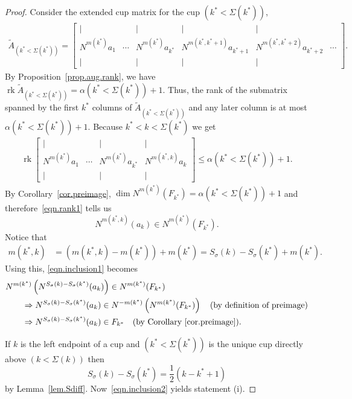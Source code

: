 \documentclass[11pt]{amsart}
\theoremstyle{remark}
\theoremstyle{remark}
\theoremstyle{definition}
\theoremstyle{definition}
\theoremstyle{definition}
\numberwithin{equation}{section}
\newcommand{\rk}{\operatorname{rk}}
\newcommand{\gs}{\sigma}
\newcommand{\al}{\alpha}
\newcommand{\E}{\Sigma}
\newcommand{\m}[2]{m(#1,#2)}
\newcommand{\mi}[1]{m(#1)}
\begin{document}
\begin{proof} Consider the extended cup matrix for the cup $(k^* < \E(k^*))$,
\begin{eqnarray*}
 \widetilde A_{(k^*<\E(k^*))}=\begin{bmatrix}
| &  & | & | & | &  \\   
N^{\mi{k^*}}a_1 &  \cdots& N^{\mi{k^*}}a_{k^*}&  N^{\m{k^*}{k^*+1}}a_{k^*+1} & N^{\m{k^*}{k^*+2}} a_{k^*+2} & \cdots 
\\ | &  & | & | & | &
\end{bmatrix}.
\end{eqnarray*}
By Proposition~\ref{prop.aug.rank}, we have $\rk \widetilde A_{(k^*<\E(k^*))} = \al(k^*<\E(k^*))+1$. Thus, the rank of the submatrix spanned by the first $k^*$ columns of $\widetilde A_{(k^*<\E(k^*))}$ and any later column is at most $\al(k^*<\E(k^*))+1$.  Because $k^*<k < \E(k^*)$ we get
\begin{eqnarray} \label{eqn.rank1}
\rk \begin{bmatrix} | & & | & | \\ N^{\mi{k^*}}a_1 &  \cdots& N^{\mi{k^*}}a_{k^*} & N^{\m{k^*}{k}}a_k\\ | & & | & |  \end{bmatrix} \leq \al(k^*<\E(k^*))+1.
\end{eqnarray}
By Corollary~\ref{cor.preimage}, $\dim  N^{\mi{k^*}}\left(F_{k^*} \right) = \al(k^*<\E(k^*))+1$ and therefore~\eqref{eqn.rank1} tells us 
\begin{equation}\label{eqn.inclusion1}
N^{\m{k^*}{k}}(a_k) \in N^{\mi{k^*}}\left(F_{k^*} \right).
\end{equation}
Notice that 
\begin{align*}
\m{k^*}{k} &= (\m{k^*}{k} - \mi{k^*}) + \mi{k^*} = S_\gs(k) - S_\gs(k^*) + \mi{k^*}. 
\end{align*}
Using this, \eqref{eqn.inclusion1} becomes
\begin{align} \label{eqn.inclusion2}
\nonumber & N^{\mi{k^*}} \left( N^{S_\gs(k)-S_\gs(k^*)}(a_k) \right)\in N^{\mi{k^*}}(F_{k^*} )\\ 
 &\quad\quad \Rightarrow  N^{S_\gs(k)-S_\gs(k^*)}(a_k) \in N^{-\mi{k^*}} \left( N^{\mi{k^*}}(F_{k^*} )\right) \quad \text{(by definition of preimage)}  \nonumber \\
 & \quad\quad \Rightarrow  N^{S_\gs(k)-S_\gs(k^*)}(a_k) \in F_{k^*} \quad \text{(by Corollary~\ref{cor.preimage}).} 
\end{align}

If $k$ is the left endpoint of a cup and $(k^*<\E(k^*))$ is the unique cup directly above $(k<\E(k))$ then 
\[
S_\gs(k)-S_\gs(k^*) = \frac{1}{2}\left(k-k^*+1\right)
\]
by Lemma~\ref{lem.Sdiff}. Now~\eqref{eqn.inclusion2} yields statement (i).


\end{proof}
\end{document}
